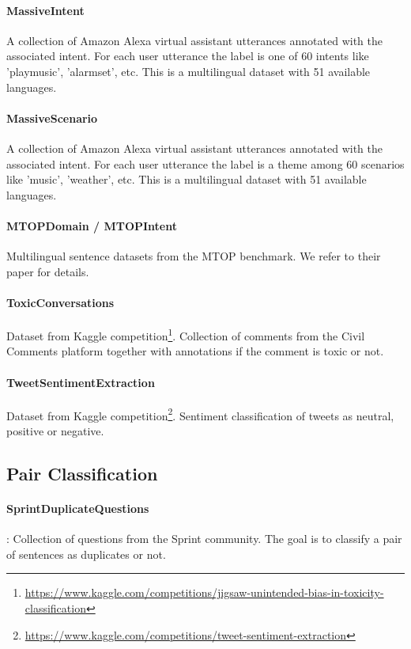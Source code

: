 \documentclass[11pt]{article}
\begin{document}
\paragraph{MassiveIntent} \cite{fitzgerald2022massive} A collection of Amazon Alexa virtual assistant utterances annotated with the associated intent. For each user utterance the label is one of 60 intents like 'play\textunderscore music', 'alarm\textunderscore set', etc. This is a multilingual dataset with 51 available languages.

\paragraph{MassiveScenario} \cite{fitzgerald2022massive} A collection of Amazon Alexa virtual assistant utterances annotated with the associated intent. For each user utterance the label is a theme among 60 scenarios like 'music', 'weather', etc. This is a multilingual dataset with 51 available languages.

\paragraph{MTOPDomain / MTOPIntent} Multilingual sentence datasets from the MTOP \cite{li2020mtop} benchmark. We refer to their paper for details.

\paragraph{ToxicConversations} Dataset from Kaggle competition\footnote{\url{https://www.kaggle.com/competitions/jigsaw-unintended-bias-in-toxicity-classification}}. Collection of comments from the Civil Comments platform together with annotations if the comment is toxic or not.

\paragraph{TweetSentimentExtraction} Dataset from Kaggle competition\footnote{\url{https://www.kaggle.com/competitions/tweet-sentiment-extraction}}. Sentiment classification of tweets as neutral, positive or negative.

\subsection{Pair Classification}

\paragraph{SprintDuplicateQuestions} \cite{shah2018adversarial}: Collection of questions from the Sprint community. The goal is to classify a pair of sentences as duplicates or not.
\end{document}
